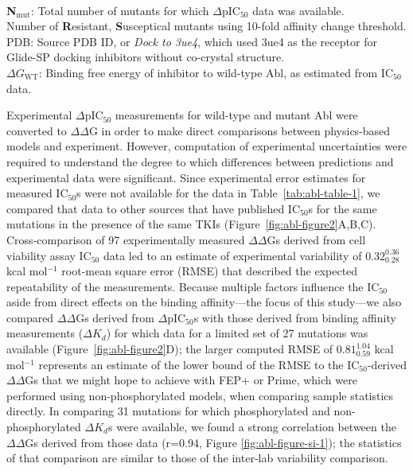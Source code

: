 \documentclass[phd,tocprelim]{cornell}
\begin{document}
\begin{landscape}
\begin{table}[bt]
	\small
	\smallskip
	\\
	{\bf N}$_\mathrm{mut}$: Total number of mutants for which $\Delta$pIC$_{50}$ data was available.\\
	Number of {\bf R}esistant, {\bf S}usceptical mutants using 10-fold affinity change threshold.\\
	PDB: Source PDB ID, or \emph{Dock to 3ue4}, which used 3ue4 as the receptor for Glide-SP docking inhibitors without co-crystal structure.\\
	$\Delta G_\mathrm{WT}$: Binding free energy of inhibitor to wild-type Abl, as estimated from IC$_{50}$ data.
\end{table}
\end{landscape}

Experimental $\Delta$pIC$_{50}$ measurements for wild-type and mutant Abl were converted to $\Delta\Delta$G in order to make direct comparisons between physics-based models and experiment.
However, computation of experimental uncertainties were required to understand the degree to which differences between predictions and experimental data were significant.
Since experimental error estimates for measured IC$_{50}$s were not available for the data in Table~\ref{tab:abl-table-1}, we compared that data to other sources that have published IC$_{50}$s for the same mutations in the presence of the same TKIs (Figure~\ref{fig:abl-figure2}A,B,C).
Cross-comparison of 97 experimentally measured $\Delta\Delta$Gs derived from cell viability assay IC$_{50}$ data led to an estimate of experimental variability of $0.32^{0.36}_{0.28}$ kcal mol$^{-1}$ root-mean square error (RMSE) that described the expected repeatability of the measurements.
Because multiple factors influence the IC$_{50}$ aside from direct effects on the binding affinity---the focus of this study---we also compared $\Delta\Delta$Gs derived from $\Delta$pIC$_{50}$s with those derived from binding affinity measurements ($\Delta K_{d}$) for which data for a limited set of 27 mutations was available (Figure~\ref{fig:abl-figure2}D); the larger computed RMSE of $0.81^{1.04}_{0.59}$ kcal mol$^{-1}$ represents an estimate of the lower bound of the RMSE to the IC$_{50}$-derived $\Delta\Delta$Gs that we might hope to achieve with FEP+ or Prime, which were performed using non-phosphorylated models, when comparing sample statistics directly.
In comparing 31 mutations for which phosphorylated and non-phosphorylated $\Delta K_{d}$s were available, we found a strong correlation between the $\Delta\Delta$Gs derived from those data (r=0.94, Figure \ref{fig:abl-figure-si-1}); the statistics of that comparison are similar to those of the inter-lab variability comparison.
\end{document}
